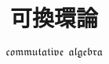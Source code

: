 \documentclass[8pt,x11names]{ltjsarticle}
\theoremstyle{definition}
\begin{document}
    \pagestyle{fancy}
    \lhead{\leftmark} %
    \chead{} %
    \rhead{\rightmark} %
    \cfoot{\thepage} %
    \rfoot{\empty} %


    \title{可換環論}
    \subtitle{$\mathfrak{commutative\ \ algebra}$} %
    \author{}
    \date{} %
    \maketitle
    \thispagestyle{empty} %


\label{mokuji} %
\tableofcontents %




\end{document}
